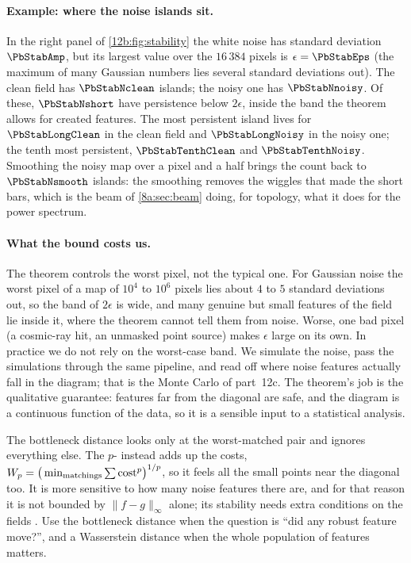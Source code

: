\paragraph{Example: where the noise islands sit.} In the right panel of \cref{12b:fig:stability} the white noise
has standard deviation $\PbStabAmp$, but its largest value over the $16\,384$ pixels is $\epsilon=\PbStabEps$ (the
maximum of many Gaussian numbers lies several standard deviations out). The clean field has $\PbStabNclean$
islands; the noisy one has $\PbStabNnoisy$. Of these, $\PbStabNshort$ have persistence below $2\epsilon$, inside the
band the theorem allows for created features. The most persistent island lives for $\PbStabLongClean$ in the clean
field and $\PbStabLongNoisy$ in the noisy one; the tenth most persistent, $\PbStabTenthClean$ and
$\PbStabTenthNoisy$. Smoothing the noisy map over a pixel and a half brings the count back to $\PbStabNsmooth$
islands: the smoothing removes the wiggles that made the short bars, which is the beam of
\cref{8a:sec:beam} doing, for topology, what it does for the power spectrum.

\paragraph{What the bound costs us.} The theorem controls the worst pixel, not the typical one. For Gaussian
noise the worst pixel of a map of $10^4$ to $10^6$ pixels lies about $4$ to $5$ standard deviations out, so the band of $2\epsilon$ is wide,
and many genuine but small features of the field lie inside it, where the theorem cannot tell them from noise.
Worse, one bad pixel (a cosmic-ray hit, an unmasked point source) makes $\epsilon$ large on its own. In practice
we do not rely on the worst-case band. We simulate the noise, pass the simulations through the same pipeline,
and read off where noise features actually fall in the diagram; that is the Monte Carlo of part~12c. The
theorem's job is the qualitative guarantee: features far from the diagonal are safe, and the diagram is a
continuous function of the data, so it is a sensible input to a statistical analysis.

\begin{pitfall}
The bottleneck distance looks only at the worst-matched pair and ignores everything else. The
$p$- instead adds up the costs, $W_p=\big(\min_{\rm matchings}\sum\text{cost}^p\big)^{1/p}$, so it
feels all the small points near the diagonal too. It is more sensitive to how many noise features there are, and
for that reason it is not bounded by $\|f-g\|_\infty$ alone; its stability needs extra conditions on the fields
\cite{Otter2017}. Use the bottleneck distance when the question is ``did any robust feature move?'', and a
Wasserstein distance when the whole population of features matters.
\end{pitfall}
